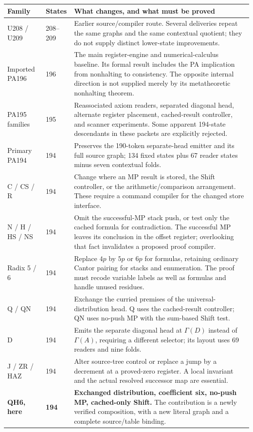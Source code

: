 \documentclass[11pt,letterpaper]{article}
\begin{document}
\begin{longtable}{@{}p{}p{}p{}@{}}
\toprule Family & States & What changes, and what must be proved\\\midrule
\endhead
U208 / U209 & 208--209 & Earlier source/compiler route. Several deliveries repeat the same graphs and the same contextual quotient; they do not supply distinct lower-state improvements.\\[3pt]
Imported PA196 & 196 & The main register-engine and numerical-calculus baseline. Its formal result includes the PA implication from nonhalting to consistency. The opposite internal direction is not supplied merely by its metatheoretic nonhalting theorem.\\[3pt]
PA195 families & 195 & Reassociated axiom readers, separated diagonal head, alternate register placement, cached-result controller, and scanner experiments. Some apparent 194-state descendants in these packets are explicitly rejected.\\[3pt]
Primary PA194 & 194 & Preserves the 190-token separate-head emitter and its full source graph; 134 fixed states plus 67 reader states minus seven contextual folds.\\[3pt]
C / CS / R & 194 & Change where an MP result is stored, the Shift controller, or the arithmetic/comparison arrangement. These require a command compiler for the changed store interface.\\[3pt]
N / H / HS / NS & 194 & Omit the successful-MP stack push, or test only the cached formula for contradiction. The successful MP leaves its conclusion in the offset register; overlooking that fact invalidates a proposed proof compiler.\\[3pt]
Radix 5 / 6 & 194 & Replace \(4p\) by \(5p\) or \(6p\) for formulas, retaining ordinary Cantor pairing for stacks and enumeration. The proof must recode variable labels as well as formulas and handle unused residues.\\[3pt]
Q / QN & 194 & Exchange the curried premises of the universal-distribution head. Q uses the cached-result controller; QN uses no-push MP with the sum-based Shift test.\\[3pt]
D & 194 & Emits the separate diagonal head at \(\Gamma(D)\) instead of \(\Gamma(A)\), requiring a different selector; its layout uses 69 readers and nine folds.\\[3pt]
J / ZR / HAZ & 194 & Alter source-tree control or replace a jump by a decrement at a proved-zero register. A local invariant and the actual resolved successor map are essential.\\[3pt]
\textbf{QH6, here} & \textbf{194} & \textbf{Exchanged distribution, coefficient six, no-push MP, cached-only Shift.} The contribution is a newly verified composition, with a new literal graph and a complete source/table binding.\\
\bottomrule
\end{longtable}
\end{document}
